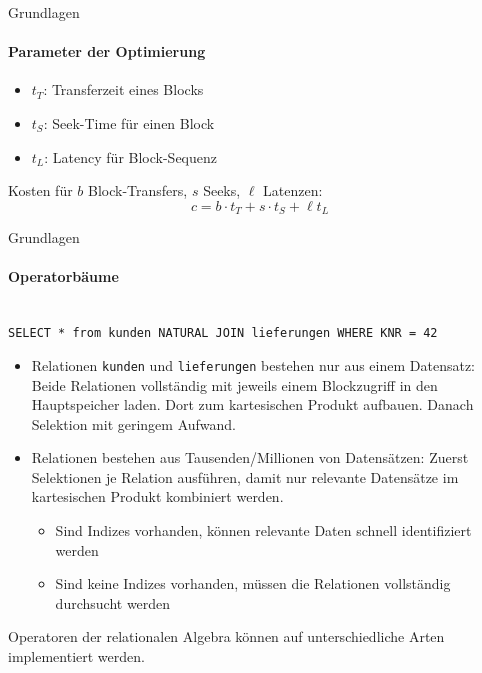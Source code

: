 \begin{frame}[t]{Grundlagen}
\framesubtitle{Parameter der Optimierung}
\begin{itemize}
\item $t_T$: Transferzeit eines Blocks 
\item $t_S$: Seek-Time f\"ur einen Block
\item $t_L$: Latency f\"ur Block-Sequenz
\end{itemize}
\abs
Kosten für $b$ Block-Transfers, $s$ Seeks, $\ell$ Latenzen: 
$$c = b \cdot t_T + s \cdot t_S + \ell t_L$$
\end{frame}

\begin{frame}{Grundlagen}
\framesubtitle{Operatorbäume}
\\[4pt]
\texttt{SELECT * from kunden NATURAL JOIN lieferungen WHERE KNR = 42}
\abs
\begin{itemize}
\item Relationen \texttt{kunden} und \texttt{lieferungen} bestehen nur aus einem Datensatz:  
Beide Relationen vollständig mit jeweils einem Blockzugriff in den Hauptspeicher laden. Dort  
zum kartesischen Produkt aufbauen. Danach Selektion mit geringem Aufwand.
\pause
\item Relationen bestehen aus Tausenden/Millionen von Datensätzen: Zuerst Selektionen je Relation ausführen, damit 
nur relevante Datensätze im kartesischen Produkt kombiniert werden.
\begin{itemize}
\item Sind Indizes vorhanden, können relevante Daten schnell identifiziert werden
\item Sind keine Indizes vorhanden, müssen die Relationen vollständig durchsucht werden
\end{itemize}
\end{itemize}
\abs
\pause
Operatoren der relationalen Algebra können auf unterschiedliche Arten implementiert werden.
\end{frame}

